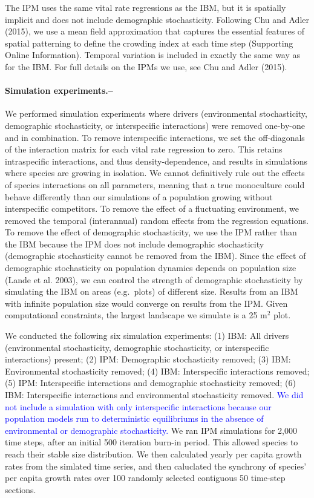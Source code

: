 \documentclass[11pt,]{article}
\begin{document}
The IPM uses the same vital rate regressions as the IBM, but it is
spatially implicit and does not include demographic stochasticity.
Following Chu and Adler (2015), we use a mean field approximation that
captures the essential features of spatial patterning to define the
crowding index at each time step (Supporting Online Information).
Temporal variation is included in exactly the same way as for the IBM.
For full details on the IPMs we use, see Chu and Adler (2015).

\paragraph{Simulation experiments.--}\label{simulation-experiments.}

We performed simulation experiments where drivers (environmental
stochasticity, demographic stochasticity, or interspecific interactions)
were removed one-by-one and in combination. To remove interspecific
interactions, we set the off-diagonals of the interaction matrix for
each vital rate regression to zero. This retains intraspecific
interactions, and thus density-dependence, and results in simulations
where species are growing in isolation. We cannot definitively rule out
the effects of species interactions on all parameters, meaning that a
true monoculture could behave differently than our simulations of a
population growing without interspecific competitors. To remove the
effect of a fluctuating environment, we removed the temporal
(interannual) random effects from the regression equations. To remove
the effect of demographic stochasticity, we use the IPM rather than the
IBM because the IPM does not include demographic stochasticity
(demographic stochasticity cannot be removed from the IBM). Since the
effect of demographic stochasticity on population dynamics depends on
population size (Lande et al. 2003), we can control the strength of
demographic stochasticity by simulating the IBM on areas (e.g.~plots) of
different size. Results from an IBM with infinite population size would
converge on results from the IPM. Given computational constraints, the
largest landscape we simulate is a 25 \(\text{m}^2\) plot.

We conducted the following six simulation experiments: (1) IBM: All
drivers (environmental stochasticity, demographic stochasticity, or
interspecific interactions) present; (2) IPM: Demographic stochasticity
removed; (3) IBM: Environmental stochasticity removed; (4) IBM:
Interspecific interactions removed; (5) IPM: Interspecific interactions
and demographic stochasticity removed; (6) IBM: Interspecific
interactions and environmental stochasticity removed.
\textcolor{blue}{We did not include a simulation with only interspecific interactions because our population models run to deterministic equilibriums in the absence of environmental or demographic stochasticity.}
We ran IPM simulations for 2,000 time steps, after an initial 500
iteration burn-in period. This allowed species to reach their stable
size distribution. We then calculated yearly per capita growth rates
from the simlated time series, and then caluclated the synchrony of
species' per capita growth rates over 100 randomly selected contiguous
50 time-step sections.
\end{document}
